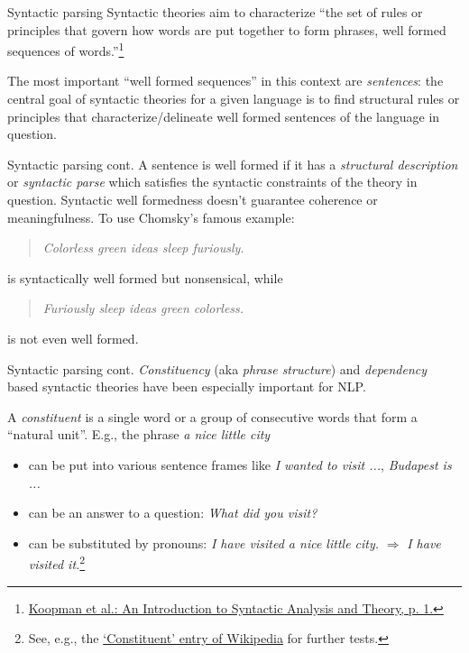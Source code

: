 \documentclass[style=upen, size=14pt]{powerdot}
\newcommand{\gold}{\color{arany}}
\begin{document}
\begin{slide}{Syntactic parsing}
  Syntactic theories aim to characterize ``the set of rules or principles that
  govern how words are put together to form phrases, well formed sequences of
  words.''\footnote{\href{https://linguistics.ucla.edu/people/stabler/isat.pdf}{Koopman
      et al.: An Introduction to Syntactic Analysis and Theory, p. 1.}}\bigskip

  The most important ``well formed sequences'' in this context are
  \emph{sentences}: the central goal of syntactic theories for a given language
  is to find structural rules or principles that characterize/delineate well
  formed sentences of the language in question.
\end{slide}

\begin{slide}[toc=]{Syntactic parsing cont.}
  A sentence is well formed if it has a \emph{structural description} or
  \emph{syntactic parse} which satisfies the syntactic constraints of the theory in
  question. Syntactic well formedness doesn't guarantee coherence or
  meaningfulness. To use Chomsky's famous example:
  
  \begin{quotation}
    \emph{Colorless green ideas sleep furiously.}
  \end{quotation}
  
  is syntactically well formed but nonsensical, while

  \begin{quotation}
    \emph{Furiously sleep ideas green colorless.}
  \end{quotation}

  is not even well formed.
\end{slide}

\begin{slide}[toc=]{Syntactic parsing cont.}
  \emph{\gold Constituency} (aka \emph{phrase structure}) and \emph{\gold
    dependency} based syntactic theories have been especially important for NLP.\bigskip

  A \emph{\gold constituent} is a single word or a group of consecutive words
  that form a ``natural unit''. E.g., the phrase \emph{a nice little city}
  \begin{itemize}
  \item can be put into various sentence frames like \emph{I wanted to visit
      ...}, \emph{Budapest is ...}
  \item can be an answer to a question: \emph{What did you visit?}
  \item can be substituted by pronouns: \emph{I have visited a nice little
      city.} $\Rightarrow$ \emph{I have visited it.}\footnote{See, e.g., the
      \href{https://en.wikipedia.org/wiki/Constituent_(linguistics)}{`Constituent'
        entry of Wikipedia} for further tests.}
  \end{itemize}
\end{slide}
\end{document}

